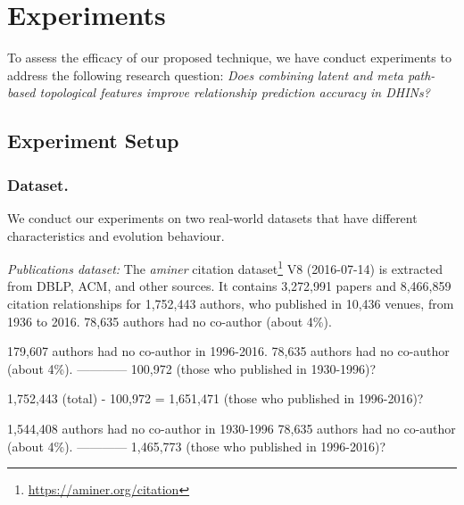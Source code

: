 \section{Experiments}

To assess the efficacy of our proposed technique, we have conduct experiments to address the following research question: \textit{Does combining latent and meta path-based topological features improve relationship prediction accuracy in DHINs?}


\subsection{Experiment Setup}

\subsubsection{Dataset.} We conduct our experiments on two real-world datasets that have different characteristics and evolution behaviour. 

\textit{Publications dataset:} The \textit{aminer} citation dataset\footnote{\url{https://aminer.org/citation}} V8 (2016-07-14) is extracted from DBLP, ACM, and other sources. It contains 3,272,991 papers and 8,466,859 citation relationships for 1,752,443 authors, who published in 10,436 venues, from 1936 to 2016. 78,635 authors had no co-author (about 4\%). 
    
    179,607 authors had no co-author in 1996-2016. 
    78,635 authors had no co-author (about 4\%). 
    ------------
    100,972 (those who published in 1930-1996)?
    
    1,752,443 (total) - 100,972 = 1,651,471 (those who published in 1996-2016)?
    
    1,544,408 authors had no co-author in 1930-1996
    78,635 authors had no co-author (about 4\%). 
    ------------
    1,465,773 (those who published in 1996-2016)?

